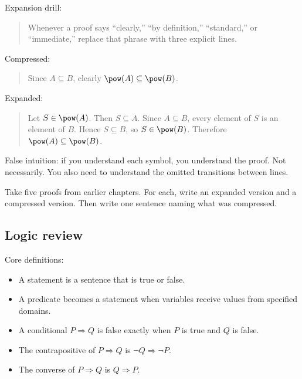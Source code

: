 \begin{formalbox}
Expansion drill:
\begin{quote}
Whenever a proof says ``clearly,'' ``by definition,'' ``standard,'' or ``immediate,'' replace that phrase with three explicit lines.
\end{quote}
\end{formalbox}

Compressed:

\begin{quote}
Since $A\subseteq B$, clearly $\pow(A)\subseteq\pow(B)$.
\end{quote}

Expanded:

\begin{quote}
Let $S\in\pow(A)$. Then $S\subseteq A$. Since $A\subseteq B$, every element of $S$ is an element of $B$. Hence $S\subseteq B$, so $S\in\pow(B)$. Therefore $\pow(A)\subseteq\pow(B)$.
\end{quote}

\begin{trapbox}
False intuition: if you understand each symbol, you understand the proof. Not necessarily. You also need to understand the omitted transitions between lines.
\end{trapbox}

\begin{labbox}
Take five proofs from earlier chapters. For each, write an expanded version and a compressed version. Then write one sentence naming what was compressed.
\end{labbox}

\subsection{Logic review}

Core definitions:

\begin{itemize}
\item A statement is a sentence that is true or false.
\item A predicate becomes a statement when variables receive values from specified domains.
\item A conditional $P\Rightarrow Q$ is false exactly when $P$ is true and $Q$ is false.
\item The contrapositive of $P\Rightarrow Q$ is $\neg Q\Rightarrow\neg P$.
\item The converse of $P\Rightarrow Q$ is $Q\Rightarrow P$.
\end{itemize}

